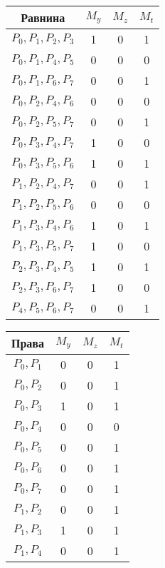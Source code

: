 \documentclass[11pt, oneside]{article}   	%
\begin{document}
\begin{table} 
\begin{minipage}[t]{.3\textwidth}
\begin{tabular}{cccc}
\toprule
\textbf{Равнина} & \textbf{$M_{y}$} & \textbf{$M_{z}$} & \textbf{$M_{t}$}\\
\midrule
$ P_{0}, P_{1}, P_{2}, P_{3} $ & 1 & 0 & 1 \\
$ P_{0}, P_{1}, P_{4}, P_{5} $ & 0 & 0 & 0 \\
$ P_{0}, P_{1}, P_{6}, P_{7} $ & 0 & 0 & 1 \\
$ P_{0}, P_{2}, P_{4}, P_{6} $ & 0 & 0 & 0 \\
$ P_{0}, P_{2}, P_{5}, P_{7} $ & 0 & 0 & 1 \\
$ P_{0}, P_{3}, P_{4}, P_{7} $ & 1 & 0 & 0 \\
$ P_{0}, P_{3}, P_{5}, P_{6} $ & 1 & 0 & 1 \\
$ P_{1}, P_{2}, P_{4}, P_{7} $ & 0 & 0 & 1 \\
$ P_{1}, P_{2}, P_{5}, P_{6} $ & 0 & 0 & 0 \\
$ P_{1}, P_{3}, P_{4}, P_{6} $ & 1 & 0 & 1 \\
$ P_{1}, P_{3}, P_{5}, P_{7} $ & 1 & 0 & 0 \\
$ P_{2}, P_{3}, P_{4}, P_{5} $ & 1 & 0 & 1 \\
$ P_{2}, P_{3}, P_{6}, P_{7} $ & 1 & 0 & 0 \\
$ P_{4}, P_{5}, P_{6}, P_{7} $ & 0 & 0 & 1 \\
\bottomrule
\end{tabular}
\end{minipage} \hfill
\begin{minipage}[t]{.3\textwidth}
\begin{tabular}{cccc}
\toprule
\textbf{Права} & \textbf{$M_{y}$} & \textbf{$M_{z}$} & \textbf{$M_{t}$}\\
\midrule
$ P_{0}, P_{1} $ & 0 & 0 & 1 \\
$ P_{0}, P_{2} $ & 0 & 0 & 1 \\
$ P_{0}, P_{3} $ & 1 & 0 & 1 \\
$ P_{0}, P_{4} $ & 0 & 0 & 0 \\
$ P_{0}, P_{5} $ & 0 & 0 & 1 \\
$ P_{0}, P_{6} $ & 0 & 0 & 1 \\
$ P_{0}, P_{7} $ & 0 & 0 & 1 \\
$ P_{1}, P_{2} $ & 0 & 0 & 1 \\
$ P_{1}, P_{3} $ & 1 & 0 & 1 \\
$ P_{1}, P_{4} $ & 0 & 0 & 1 \\

\end{tabular}
\end{minipage}
\end{table}
\end{document}

